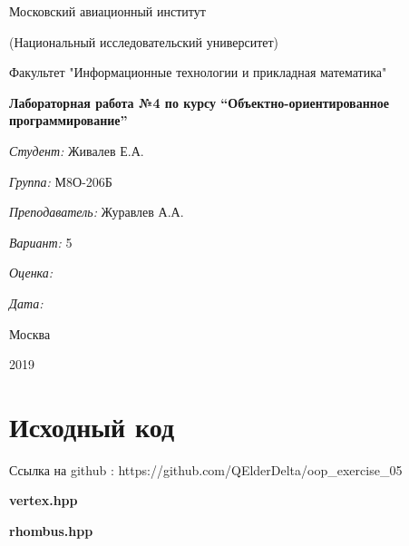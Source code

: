 \documentclass[a4paper, 12pt]{article}
\begin{document}
\thispagestyle{empty}	
\begin{center}
	Московский авиационный институт
	
	(Национальный исследовательский университет)
	
	Факультет "Информационные технологии и прикладная математика"
	
\end{center}
\vspace{40ex}
\begin{center}
	\textbf{\large{Лабораторная работа №4 по курсу \textquotedblleft Объектно-ориентированное программирование\textquotedblright}}
\end{center}
\vspace{40ex}
\begin{flushright}
	\textit{Студент: } Живалев Е.А.
	
	\vspace{2ex}
	\textit{Группа: } М8О-206Б
	
	\vspace{2ex}
	\textit{Преподаватель: } Журавлев А.А.
	
	\vspace{2ex}
	\textit{Вариант: } 5
	
	\vspace{2ex}
	\textit{Оценка: } \underline{\quad\quad\quad\quad\quad\quad}
	
	 \vspace{2ex}
	\textit{Дата: } \underline{\quad\quad\quad\quad\quad\quad}
	
\end{flushright}

\begin{vfill}
	\begin{center}
		Москва
		
		2019
	\end{center}	
\end{vfill}
\newpage
\section{Исходный код}

Ссылка на github : https://github.com/QElderDelta/oop\_exercise\_05

\vspace{3ex}
\textbf{\large{vertex.hpp}}


\vspace{3ex}
\textbf{\large{rhombus.hpp}}

\end{document}
